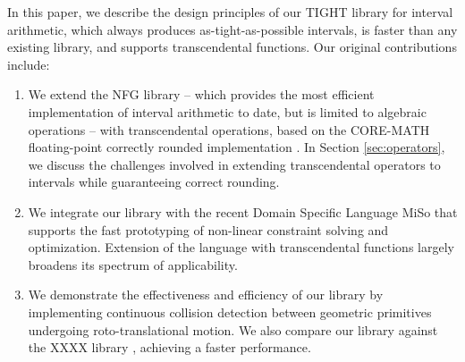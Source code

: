 In this paper, we describe the design principles of our TIGHT library for interval arithmetic, which always produces as-tight-as-possible intervals, is faster than any existing library, and supports transcendental functions.
%
Our original contributions include:
\begin{enumerate}
\item We extend the NFG library \cite{nfg} -- which provides the most efficient implementation of interval arithmetic to date, but is limited to algebraic operations -- with transcendental operations, based on the CORE-MATH floating-point correctly rounded implementation \cite{Sibidanov2022}.
In Section \ref{sec:operators}, we discuss the challenges involved in extending transcendental operators to intervals while guaranteeing correct rounding. 
\item We integrate our library with the recent Domain Specific Language MiSo \cite{Sichetti2025} that supports the fast prototyping of non-linear constraint solving and optimization. 
Extension of the language with transcendental functions largely broadens its spectrum of applicability. 
\item We demonstrate the effectiveness and efficiency of our library by implementing continuous collision detection between geometric primitives undergoing roto-translational motion.  We also compare our library against the XXXX library \cite{something}, achieving a faster performance.
\end{enumerate}





